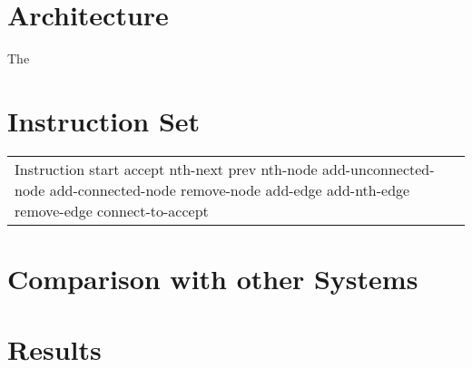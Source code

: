 \section{Architecture}
The 
\section{Instruction Set}
\begin{tabular}{l}
Instruction
\hline
start
accept
nth-next
prev
nth-node
add-unconnected-node
add-connected-node
remove-node
add-edge
add-nth-edge
remove-edge
connect-to-accept
\end{tabular}
\section{Comparison with other Systems}
\section{Results}